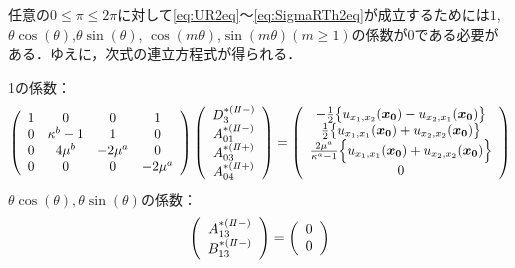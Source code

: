 
任意の$0\leq\pi\leq2\pi$に対して\eqref{eq:UR2eq}～\eqref{eq:SigmaRTh2eq}が成立するためには$1$,$\theta\cos(\theta)$,$\theta\sin(\theta)$,
$\cos(m\theta)$,$\sin(m\theta)$$(m\geq1)$の係数が0である必要がある．ゆえに，次式の連立方程式が得られる．

1の係数：
\begin{align}
	\left(
	\begin{array}{cccc}
		1& 0 & 0 & 1 \\
		0 & \kappa^b-1 & 1 & 0 \\
		0 & 4\mu^{b} & -2\mu^{a} & 0 \\
		0 & 0 & 0 & -2\mu^{a} \\
	\end{array}
	\right)
	\left(
	\begin{array}{c}
		D_{3}^{*(I\hspace{-.15em}I-)} \\
	 	A_{01}^{*(I\hspace{-.15em}I-)} \\
		A_{03}^{*(I\hspace{-.15em}I+)}\\
	 	A_{04}^{*(I\hspace{-.15em}I+)} \\
	\end{array}
	\right)
	=
	\left(
	\begin{array}{c}
	 	-\frac{1}{2}\bigl\{u_{x_{1},x_{2}}(\bm{x_{0}})-u_{x_{2},x_{1}}(\bm{x_{0}})\bigr\} \\
		\frac{1}{2}\bigl\{u_{x_{1},x_{1}}(\bm{x_{0}})+u_{x_{2},x_{2}}(\bm{x_{0}})\bigr\} \\
		\frac{2\mu^a}{\kappa^a-1}\Bigl\{ u_{x_{1},x_{1}}(\bm{x_{0}})+ u_{x_{2},x_{2}}(\bm{x_{0}})\Bigr\} \\
	 	0 \\
	\end{array}
	\right)
\end{align}
$\theta\cos(\theta),\theta\sin(\theta)$の係数：
\begin{align}
	\left(
	\begin{array}{c}
		A_{13}^{*(I\hspace{-.15em}I-)} \\
	 	B_{13}^{*(I\hspace{-.15em}I-)} \\
	\end{array}
	\right)
	=
	\left(
	\begin{array}{c}
		0 \\
	 	0 \\
	\end{array}
	\right)
\end{align}
